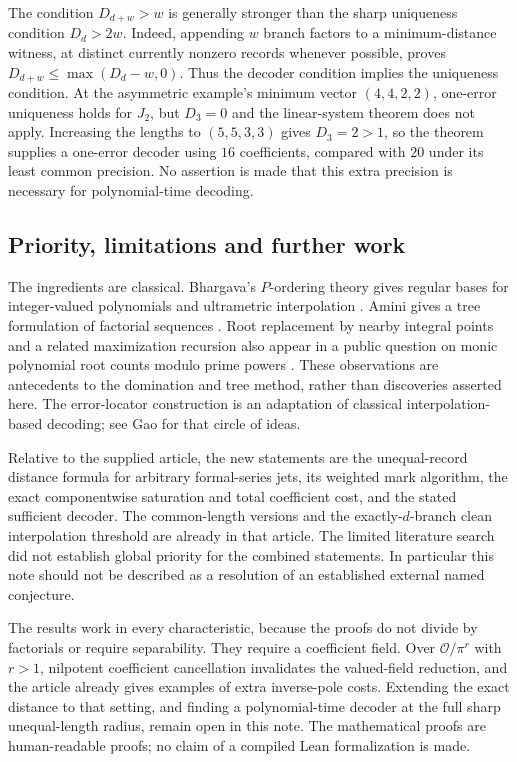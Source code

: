 \begin{remark}
The condition $D_{d+w}>w$ is generally stronger than the sharp uniqueness
condition $D_d>2w$. Indeed, appending $w$ branch factors to a
minimum-distance witness, at distinct currently nonzero records whenever
possible, proves $D_{d+w}\le\max(D_d-w,0)$. Thus the decoder condition
implies the uniqueness condition. At the asymmetric example's minimum vector
$(4,4,2,2)$, one-error uniqueness holds for $J_2$, but $D_3=0$ and the
linear-system theorem does not apply. Increasing the lengths to
$(5,5,3,3)$ gives $D_3=2>1$, so the theorem supplies a one-error decoder
using $16$ coefficients, compared with $20$ under its least common
precision. No assertion is made that this extra precision is necessary for
polynomial-time decoding.
\end{remark}

\subsection{Priority, limitations and further work}

The ingredients are classical. Bhargava's $P$-ordering theory gives regular
bases for integer-valued polynomials and ultrametric interpolation
\cite{Bhargava2009}. Amini gives a tree formulation of factorial sequences
\cite{Amini2016}. Root replacement by nearby integral points and a related
maximization recursion also appear in a public question on monic polynomial
root counts modulo prime powers \cite{MO}. These observations are antecedents
to the domination and tree method, rather than discoveries asserted here.
The error-locator construction is an adaptation of classical
interpolation-based decoding; see Gao \cite{Gao} for that circle of ideas.

Relative to the supplied article, the new statements are the unequal-record
distance formula for arbitrary formal-series jets, its weighted mark
algorithm, the exact componentwise saturation and total coefficient cost,
and the stated sufficient decoder. The common-length versions and the
exactly-$d$-branch clean interpolation threshold are already in that article.
The limited literature search did not establish global priority for the
combined statements. In particular this note should not be described as a
resolution of an established external named conjecture.

The results work in every characteristic, because the proofs do not divide
by factorials or require separability. They require a coefficient field.
Over $\mathcal O/\pi^r$ with $r>1$, nilpotent coefficient cancellation invalidates
the valued-field reduction, and the article already gives examples of extra
inverse-pole costs. Extending the exact distance to that setting, and finding
a polynomial-time decoder at the full sharp unequal-length radius, remain
open in this note. The mathematical proofs are human-readable proofs;
no claim of a compiled Lean formalization is made.

